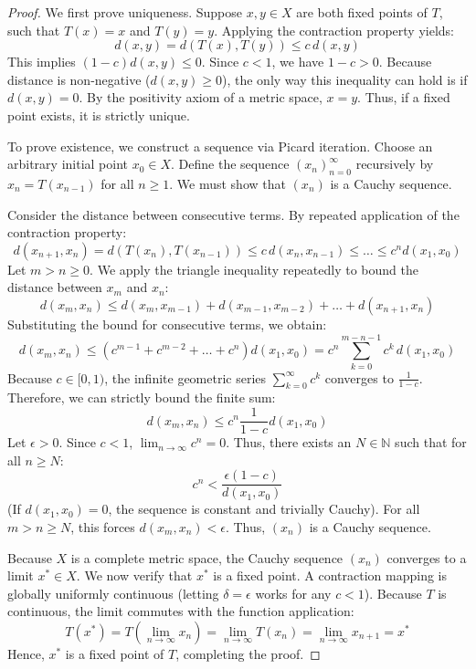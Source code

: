 \begin{proof}
We first prove uniqueness. Suppose $x, y \in X$ are both fixed points of $T$, such that $T(x) = x$ and $T(y) = y$. Applying the contraction property yields:
$$ d(x, y) = d(T(x), T(y)) \le c \, d(x, y) $$
This implies $(1 - c) d(x, y) \le 0$. Since $c < 1$, we have $1 - c > 0$. Because distance is non-negative ($d(x, y) \ge 0$), the only way this inequality can hold is if $d(x, y) = 0$. By the positivity axiom of a metric space, $x = y$. Thus, if a fixed point exists, it is strictly unique.

To prove existence, we construct a sequence via Picard iteration. Choose an arbitrary initial point $x_0 \in X$. Define the sequence $(x_n)_{n=0}^\infty$ recursively by $x_{n} = T(x_{n-1})$ for all $n \ge 1$. We must show that $(x_n)$ is a Cauchy sequence.

Consider the distance between consecutive terms. By repeated application of the contraction property:
$$ d(x_{n+1}, x_n) = d(T(x_n), T(x_{n-1})) \le c \, d(x_n, x_{n-1}) \le \dots \le c^n d(x_1, x_0) $$
Let $m > n \ge 0$. We apply the triangle inequality repeatedly to bound the distance between $x_m$ and $x_n$:
$$ d(x_m, x_n) \le d(x_m, x_{m-1}) + d(x_{m-1}, x_{m-2}) + \dots + d(x_{n+1}, x_n) $$
Substituting the bound for consecutive terms, we obtain:
$$ d(x_m, x_n) \le (c^{m-1} + c^{m-2} + \dots + c^n) d(x_1, x_0) = c^n \sum_{k=0}^{m-n-1} c^k \, d(x_1, x_0) $$
Because $c \in [0, 1)$, the infinite geometric series $\sum_{k=0}^\infty c^k$ converges to $\frac{1}{1-c}$. Therefore, we can strictly bound the finite sum:
$$ d(x_m, x_n) \le c^n \frac{1}{1 - c} d(x_1, x_0) $$
Let $\epsilon > 0$. Since $c < 1$, $\lim_{n \to \infty} c^n = 0$. Thus, there exists an $N \in \mathbb{N}$ such that for all $n \ge N$:
$$ c^n < \frac{\epsilon (1 - c)}{d(x_1, x_0)} $$
(If $d(x_1, x_0) = 0$, the sequence is constant and trivially Cauchy). For all $m > n \ge N$, this forces $d(x_m, x_n) < \epsilon$. Thus, $(x_n)$ is a Cauchy sequence.

Because $X$ is a complete metric space, the Cauchy sequence $(x_n)$ converges to a limit $x^* \in X$. We now verify that $x^*$ is a fixed point. A contraction mapping is globally uniformly continuous (letting $\delta = \epsilon$ works for any $c < 1$). Because $T$ is continuous, the limit commutes with the function application:
$$ T(x^*) = T\left(\lim_{n \to \infty} x_n\right) = \lim_{n \to \infty} T(x_n) = \lim_{n \to \infty} x_{n+1} = x^* $$
Hence, $x^*$ is a fixed point of $T$, completing the proof.
\end{proof}
